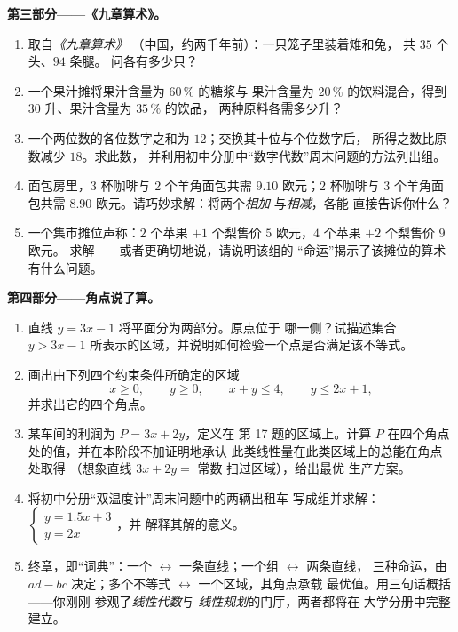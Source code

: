 \begin{problem}
\medskip
\noindent\textbf{第三部分——《九章算术》。}
\begin{enumerate}[resume]
  \item 取自\emph{《九章算术》}
        （中国，约两千年前）：一只笼子里装着雉和兔，
        共 $35$ 个头、$94$ 条腿。
        问各有多少只？
  \item 一个果汁摊将果汁含量为 $60\,\%$ 的糖浆与
        果汁含量为 $20\,\%$ 的饮料混合，得到 $30$ 升、果汁含量为 $35\,\%$ 的饮品，
        两种原料各需多少升？
  \item 一个两位数的各位数字之和为 $12$；交换其十位与个位数字后，
        所得之数比原数减少 $18$。求此数，
        并利用初中分册中“数字代数”周末问题的方法列出组。
  \item 面包房里，$3$ 杯咖啡与 $2$ 个羊角面包共需
        $9.10$ 欧元；$2$ 杯咖啡与 $3$ 个羊角面包共需
        $8.90$ 欧元。请巧妙求解：将两个\emph{相加}
        与\emph{相减}，各能
        直接告诉你什么？
  \item 一个集市摊位声称：$2$ 个苹果 $+ 1$ 个梨售价
        $5$ 欧元，$4$ 个苹果 $+ 2$ 个梨售价 $9$ 欧元。
        求解——或者更确切地说，请说明该组的
        “命运”揭示了该摊位的算术有什么问题。
\end{enumerate}

\medskip
\noindent\textbf{第四部分——角点说了算。}
\begin{enumerate}[resume]
  \item 直线 $y = 3x - 1$ 将平面分为两部分。原点位于
        哪一侧？试描述集合
        $y > 3x - 1$ 所表示的区域，并说明如何检验一个点是否满足该不等式。
  \item 画出由下列四个约束条件所确定的区域
        \[
        x \geq 0, \qquad y \geq 0, \qquad x + y \leq 4,
        \qquad y \leq 2x + 1,
        \]
        并求出它的四个角点。
  \item 某车间的利润为 $P = 3x + 2y$，定义在
        第 17 题的区域上。计算 $P$ 在四个角点处的值，并在本阶段不加证明地承认
        此类线性量在此类区域上的总能在角点处取得
        （想象直线
        $3x + 2y =$ 常数 扫过区域），给出最优
        生产方案。
  \item 将初中分册“双温度计”周末问题中的两辆出租车
        写成组并求解：
        $\begin{cases} y = 1.5x + 3 \\ y = 2x \end{cases}$，并
        解释其解的意义。
  \item 终章，即“词典”：一个 $\leftrightarrow$
        一条直线；一个组 $\leftrightarrow$ 两条直线，
        三种命运，由 $ad - bc$ 决定；多个不等式
        $\leftrightarrow$ 一个区域，其角点承载
        最优值。用三句话概括——你刚刚
        参观了\emph{线性代数}与
        \emph{线性规划}的门厅，两者都将在
        大学分册中完整建立。
\end{enumerate}
\end{problem}
